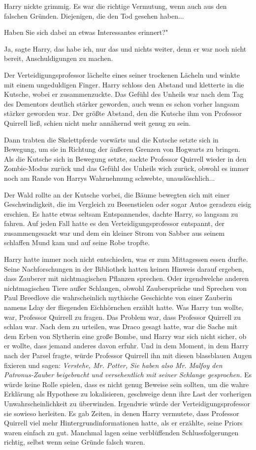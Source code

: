Harry nickte grimmig. Es war die richtige Vermutung, wenn auch aus den falschen
Gründen. Diejenigen, die den Tod gesehen haben...

\glqq Haben Sie sich dabei an etwas Interessantes erinnert?"

\glqq Ja\grqq{}, sagte Harry, \glqq das habe ich\grqq{}, nur das und nichts
weiter, denn er war noch nicht bereit, Anschuldigungen zu machen.

Der Verteidigungsprofessor lächelte eines seiner trockenen Lächeln und winkte
mit einem ungeduldigen Finger. Harry schloss den Abstand und kletterte in die
Kutsche, wobei er zusammenzuckte. Das Gefühl des Unheils war nach dem Tag des
Dementors deutlich stärker geworden, auch wenn es schon vorher langsam stärker
geworden war. Der größte Abstand, den die Kutsche ihm von Professor Quirrell
ließ, schien nicht mehr annähernd weit genug zu sein.

Dann trabten die Skelettpferde vorwärts und die Kutsche setzte sich in Bewegung,
um sie in Richtung der äußeren Grenzen von Hogwarts zu bringen. Als die Kutsche
sich in Bewegung setzte, sackte Professor Quirrell wieder in den Zombie-Modus
zurück und das Gefühl des Unheils wich zurück, obwohl es immer noch am Rande von
Harrys Wahrnehmung schwebte, unauslöschlich...

Der Wald rollte an der Kutsche vorbei, die Bäume bewegten sich mit einer
Geschwindigkeit, die im Vergleich zu Besenstielen oder sogar Autos geradezu
eisig erschien. Es hatte etwas seltsam Entspannendes, dachte Harry, so langsam
zu fahren. Auf jeden Fall hatte es den Verteidigungsprofessor entspannt, der
zusammengesackt war und dem ein kleiner Strom von Sabber aus seinem schlaffen
Mund kam und auf seine Robe tropfte.

Harry hatte immer noch nicht entschieden, was er zum Mittagessen essen durfte.
Seine Nachforschungen in der Bibliothek hatten keinen Hinweis darauf ergeben,
dass Zauberer mit nichtmagischen Pflanzen sprechen. Oder irgendwelche anderen
nichtmagischen Tiere außer Schlangen, obwohl Zaubersprüche und Sprechen von Paul
Breedlove die wahrscheinlich mythische Geschichte von einer Zauberin namens Lday
der fliegenden Eichhörnchen erzählt hatte. Was Harry tun wollte, war, Professor
Quirrell zu fragen. Das Problem war, dass Professor Quirrell zu schlau war. Nach
dem zu urteilen, was Draco gesagt hatte, war die Sache mit dem Erben von
Slytherin eine große Bombe, und Harry war sich nicht sicher, ob er wollte, dass
jemand anderes davon erfuhr. Und in dem Moment, in dem Harry nach der Parsel
fragte, würde Professor Quirrell ihn mit diesen blassblauen Augen fixieren und
sagen:
\emph{ Verstehe, Mr. Potter, Sie haben also Mr. Malfoy den Patronus-Zauber beigebracht und versehentlich mit seiner Schlange gesprochen.}
Es würde keine Rolle spielen, dass es nicht genug Beweise sein sollten, um die
wahre Erklärung als Hypothese zu lokalisieren, geschweige denn ihre Last der
vorherigen Unwahrscheinlichkeit zu überwinden. Irgendwie würde der
Verteidigungsprofessor sie sowieso herleiten. Es gab Zeiten, in denen Harry
vermutete, dass Professor Quirrell viel mehr Hintergrundinformationen hatte, als
er erzählte, seine Priors waren einfach zu gut. Manchmal lagen seine
verblüffenden Schlussfolgerungen richtig, selbst wenn seine Gründe falsch waren.

